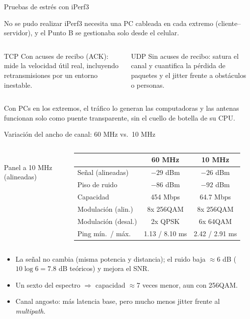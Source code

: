 \begin{frame}{Pruebas de estrés con iPerf3}
  \begin{alertblock}{No se pudo realizar}
    iPerf3 necesita una PC cableada en cada extremo (cliente--servidor), y el Punto B se
    gestionaba solo desde el celular.
  \end{alertblock}
  \vspace{4pt}
  \begin{columns}[T]
    \begin{block}{TCP}
      \small Con acuses de recibo (ACK): mide la velocidad útil real, incluyendo
      retransmisiones por un entorno inestable.
    \end{block}
    \begin{block}{UDP}
      \small Sin acuses de recibo: satura el canal y cuantifica la pérdida de paquetes y el
      jitter frente a obstáculos o personas.
    \end{block}
  \end{columns}
  \vspace{4pt}
  \small Con PCs en los extremos, el tráfico lo generan las computadoras y las antenas
  funcionan solo como puente transparente, sin el cuello de botella de su CPU.
\end{frame}

\begin{frame}{Variación del ancho de canal: 60 MHz vs.\ 10 MHz}
  \begin{columns}[c]
    \centering
    \\ {\scriptsize Panel a 10 MHz (alineadas)}
    \centering
    \footnotesize
    \begin{tabular}{@{}lcc@{}}
      \toprule
       & \textbf{60 MHz} & \textbf{10 MHz} \\ \midrule
      Señal (alineadas) & $-29$ dBm & $-26$ dBm \\
      Piso de ruido & $-86$ dBm & $-92$ dBm \\
      Capacidad & 454 Mbps & 64.7 Mbps \\
      Modulación (alin.) & 8x 256QAM & 8x 256QAM \\
      Modulación (desal.) & 2x QPSK & 6x 64QAM \\
      Ping mín.\ / máx. & 1.13 / 8.10 ms & 2.42 / 2.91 ms \\
      \bottomrule
    \end{tabular}
  \end{columns}
  \vspace{6pt}
  \small
  \begin{itemize}
    \item La señal no cambia (misma potencia y distancia); el ruido baja $\approx$6 dB
          ($10\log 6 = 7.8$ dB teóricos) y mejora el SNR.
    \item Un sexto del espectro $\Rightarrow$ capacidad $\approx$7 veces menor, aun con 256QAM.
    \item Canal angosto: más latencia base, pero mucho menos jitter frente al \emph{multipath}.
  \end{itemize}
\end{frame}

